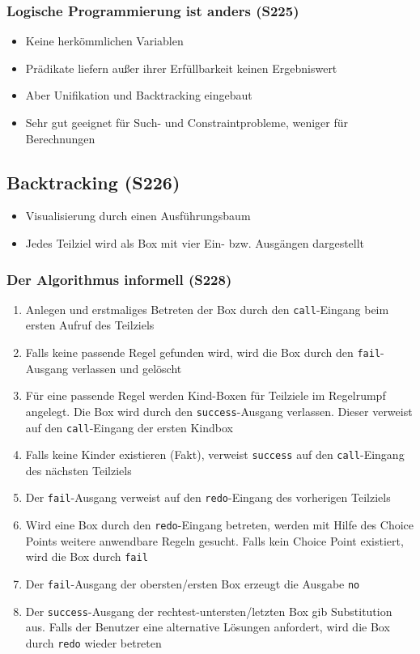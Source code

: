 \subsubsection{Logische Programmierung ist anders (S225)}
\begin{itemize}
	\item Keine herkömmlichen Variablen
	\item Prädikate liefern außer ihrer Erfüllbarkeit keinen Ergebniswert
	\item Aber Unifikation und Backtracking eingebaut
	\item Sehr gut geeignet für Such- und Constraintprobleme, weniger für Berechnungen
\end{itemize}


\subsection{Backtracking (S226)}
\begin{itemize}
	\item Visualisierung durch einen Ausführungsbaum
	\item Jedes Teilziel wird als Box mit vier Ein- bzw. Ausgängen dargestellt
\end{itemize}

\subsubsection{Der Algorithmus informell (S228)}
\begin{enumerate}
	\item Anlegen und erstmaliges Betreten der Box durch den \texttt{call}-Eingang beim ersten Aufruf des Teilziels
	\item Falls keine passende Regel gefunden wird, wird die Box durch den \texttt{fail}-Ausgang verlassen und gelöscht
	\item Für eine passende Regel werden Kind-Boxen für Teilziele im Regelrumpf angelegt. Die Box wird durch den \texttt{success}-Ausgang verlassen. Dieser verweist auf den \texttt{call}-Eingang der ersten Kindbox
	\item Falls keine Kinder existieren (Fakt), verweist \texttt{success} auf den \texttt{call}-Eingang des nächsten Teilziels
	\item Der \texttt{fail}-Ausgang verweist auf den \texttt{redo}-Eingang des vorherigen Teilziels
	\item Wird eine Box durch den \texttt{redo}-Eingang betreten, werden mit Hilfe des Choice Points weitere anwendbare Regeln gesucht. Falls kein Choice Point existiert, wird die Box durch \texttt{fail}
	\item Der \texttt{fail}-Ausgang der obersten/ersten Box erzeugt die Ausgabe \texttt{no}
	\item Der \texttt{success}-Ausgang der rechtest-untersten/letzten Box gib Substitution aus. Falls der Benutzer eine alternative Lösungen anfordert, wird die Box durch \texttt{redo} wieder betreten
\end{enumerate}


